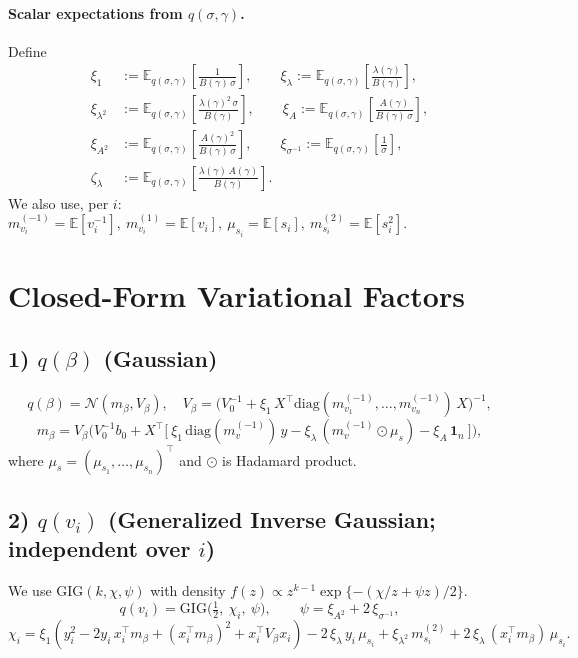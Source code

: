 \documentclass[11pt]{article}
\newcommand{\Normal}{\mathcal{N}}
\newcommand{\GIG}{\mathrm{GIG}}
\newcommand{\E}{\mathbb{E}}
\begin{document}
\paragraph{Scalar expectations from \(q(\sigma,\gamma)\).}
Define
\[
\boxed{
\begin{aligned}
\xi_1 &:= \E_{q(\sigma,\gamma)}\!\left[\frac{1}{B(\gamma)\,\sigma}\right],\qquad
\xi_{\lambda} := \E_{q(\sigma,\gamma)}\!\left[\frac{\lambda(\gamma)}{B(\gamma)}\right],\\
\xi_{\lambda^2} &:= \E_{q(\sigma,\gamma)}\!\left[\frac{\lambda(\gamma)^2\,\sigma}{B(\gamma)}\right],\qquad
\xi_A := \E_{q(\sigma,\gamma)}\!\left[\frac{A(\gamma)}{B(\gamma)\,\sigma}\right],\\
\xi_{A^2} &:= \E_{q(\sigma,\gamma)}\!\left[\frac{A(\gamma)^2}{B(\gamma)\,\sigma}\right],\qquad
\xi_{\sigma^{-1}} := \E_{q(\sigma,\gamma)}\!\left[\frac{1}{\sigma}\right],\\
\zeta_\lambda &:= \E_{q(\sigma,\gamma)}\!\left[\frac{\lambda(\gamma)\,A(\gamma)}{B(\gamma)}\right].
\end{aligned}}
\]
We also use, per \(i\): \(m_{v_i}^{(-1)}=\E[v_i^{-1}],\ m_{v_i}^{(1)}=\E[v_i],\ \mu_{s_i}=\E[s_i],\ m_{s_i}^{(2)}=\E[s_i^2]\).

\section{Closed-Form Variational Factors}

\subsection*{1) \(q(\beta)\) (Gaussian)}
\[
\boxed{
q(\beta)=\Normal(m_\beta,V_\beta),\quad
V_\beta=\Big(V_0^{-1}+\xi_1\,X^\top \mathrm{diag}(m_{v_1}^{(-1)},\ldots,m_{v_n}^{(-1)})\,X\Big)^{-1},
}
\]
\[
\boxed{
m_\beta=V_\beta\Big(
V_0^{-1}b_0
+X^\top\big[\ \xi_1\,\mathrm{diag}(m_{v}^{(-1)})\,y
-\xi_{\lambda}\,(m_{v}^{(-1)}\odot \mu_s)
-\xi_{A}\,\mathbf{1}_n\ \big]\Big),
}
\]
where \(\mu_s=(\mu_{s_1},\ldots,\mu_{s_n})^\top\) and \(\odot\) is Hadamard product.

\subsection*{2) \(q(v_i)\) (Generalized Inverse Gaussian; independent over \(i\))}
We use \(\GIG(k,\chi,\psi)\) with density \(f(z)\propto z^{k-1}\exp\{-(\chi/z+\psi z)/2\}\).
\[
\boxed{
q(v_i)=\GIG\!\big(\tfrac12,\ \chi_i,\ \psi\big),\qquad
\psi=\xi_{A^2}+2\,\xi_{\sigma^{-1}},
}
\]
\[
\boxed{
\chi_i=\xi_1\!\left(y_i^2-2y_i\,x_i^\top m_\beta+(x_i^\top m_\beta)^2+x_i^\top V_\beta x_i\right)
-2\,\xi_\lambda\,y_i\,\mu_{s_i}
+\xi_{\lambda^2}\,m_{s_i}^{(2)}
+2\,\xi_\lambda\,(x_i^\top m_\beta)\,\mu_{s_i}.
}
\]
\end{document}
